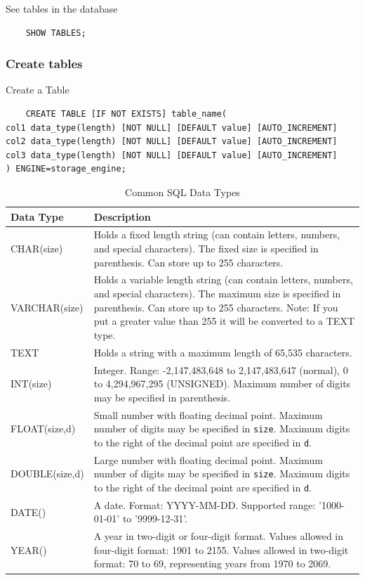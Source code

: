 See tables in the database
\begin{verbatim}
    SHOW TABLES;
\end{verbatim}


\subsubsection{Create tables}
Create a Table 

\begin{verbatim}
    CREATE TABLE [IF NOT EXISTS] table_name(
col1 data_type(length) [NOT NULL] [DEFAULT value] [AUTO_INCREMENT]
col2 data_type(length) [NOT NULL] [DEFAULT value] [AUTO_INCREMENT]
col3 data_type(length) [NOT NULL] [DEFAULT value] [AUTO_INCREMENT]
) ENGINE=storage_engine;

\end{verbatim}

\begin{table}[h!]
\centering
\begin{tabular}{|l|p{10cm}|}
\hline
\textbf{Data Type} & \textbf{Description} \\
\hline
CHAR(size) & Holds a fixed length string (can contain letters, numbers, and special characters). The fixed size is specified in parenthesis. Can store up to 255 characters. \\
\hline
VARCHAR(size) & Holds a variable length string (can contain letters, numbers, and special characters). The maximum size is specified in parenthesis. Can store up to 255 characters. Note: If you put a greater value than 255 it will be converted to a TEXT type. \\
\hline
TEXT & Holds a string with a maximum length of 65,535 characters. \\
\hline
INT(size) & Integer. Range: -2,147,483,648 to 2,147,483,647 (normal), 0 to 4,294,967,295 (UNSIGNED). Maximum number of digits may be specified in parenthesis. \\
\hline
FLOAT(size,d) & Small number with floating decimal point. Maximum number of digits may be specified in \texttt{size}. Maximum digits to the right of the decimal point are specified in \texttt{d}. \\
\hline
DOUBLE(size,d) & Large number with floating decimal point. Maximum number of digits may be specified in \texttt{size}. Maximum digits to the right of the decimal point are specified in \texttt{d}. \\
\hline
DATE() & A date. Format: YYYY-MM-DD. Supported range: '1000-01-01' to '9999-12-31'. \\
\hline
YEAR() & A year in two-digit or four-digit format. Values allowed in four-digit format: 1901 to 2155. Values allowed in two-digit format: 70 to 69, representing years from 1970 to 2069. \\
\hline
\end{tabular}
\caption{Common SQL Data Types}
\end{table}

